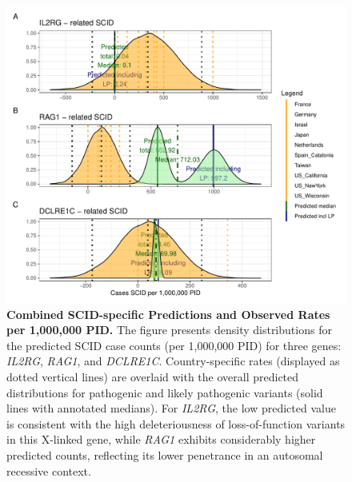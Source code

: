 \begin{figure}[ht]
  \centering
  \includegraphics[width=.75\textwidth]{../images/validation_studies_scid_combined_plot.pdf}
  \caption{\textbf{Combined SCID-specific Predictions and Observed Rates per 1,000,000 PID.}
    The figure presents density distributions for the predicted SCID case counts (per 1,000,000 PID) for three genes: \textit{IL2RG}, \textit{RAG1}, and \textit{DCLRE1C}. Country-specific rates (displayed as dotted vertical lines) are overlaid with the overall predicted distributions for pathogenic and likely pathogenic variants (solid lines with annotated medians). For \textit{IL2RG}, the low predicted value is consistent with the high deleteriousness of loss-of-function variants in this X-linked gene, while \textit{RAG1} exhibits considerably higher predicted counts, reflecting its lower penetrance in an autosomal recessive context.}
  \label{fig:scid_combined}
\end{figure}



\FloatBarrier
